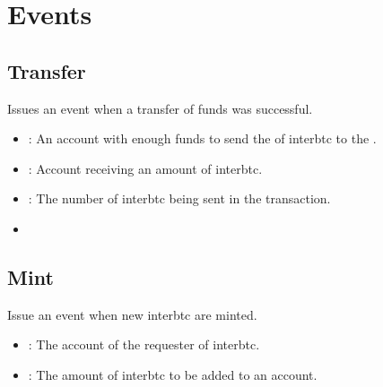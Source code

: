 \documentclass[a4paper,10pt,english]{sphinxmanual}
\begin{document}
\section{Events}
\label{\detokenize{spec/treasury:events}}

\subsection{Transfer}
\label{\detokenize{spec/treasury:id12}}
Issues an event when a transfer of funds was successful.



\begin{itemize}
\item {} 
: An account with enough funds to send the  of interbtc to the .

\item {} 
: Account receiving an amount of interbtc.

\item {} 
: The number of interbtc being sent in the transaction.

\end{itemize}

\begin{itemize}
\item {} 
{\hyperref[\detokenize{spec/treasury:transfer}]{}}

\end{itemize}


\subsection{Mint}
\label{\detokenize{spec/treasury:id13}}
Issue an event when new interbtc are minted.



\begin{itemize}
\item {} 
: The account of the requester of interbtc.

\item {} 
: The amount of interbtc to be added to an account.

\end{itemize}
\end{document}
